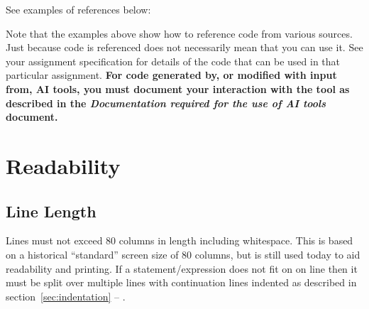 \documentclass{article}
\newcommand{\icon}[1]{\raisebox{-3pt}{\texttt{[image: icons/\#1.png]}}}
\begin{document}
See examples of references below:

\nolinenumbers
{}

\linenumbers

\nolinenumbers
{}

\linenumbers
 
\nolinenumbers
{}

\linenumbers

\nolinenumbers
{}

\linenumbers

\nolinenumbers
{}

\linenumbers

Note that the examples above show how to reference code from various sources. Just because code is referenced
does not necessarily mean that you can use it. See your assignment specification for details of the code that can
be used in that particular assignment. \textbf{For code generated by, or modified with input from, AI tools, you must
document your interaction with the tool as described in the \textit{Documentation required for the use of AI tools} document.}

\section{Readability}

\subsection{Line Length\texorpdfstring{\protect\hfill\icon{CLANG-FORMAT}}{}}
Lines must not exceed 80 columns in length including whitespace.
This is based on a historical ``standard'' screen size of 80 columns, but is still used today to aid readability and printing.
If a statement/expression does not fit on on line then it must be split over multiple lines with continuation lines indented
as described in section~\ref{sec:indentation} -- .
\end{document}
